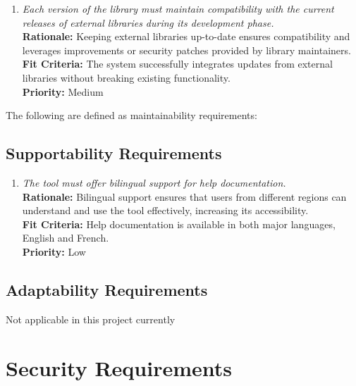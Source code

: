 \documentclass[12pt]{article}
\begin{document}
\begin{enumerate}[label=MS-MNT \arabic*., wide=0pt, leftmargin=*]
  \item \emph{Each version of the library must maintain compatibility with the current releases of external libraries during its development phase.}\\
  {\bf Rationale:} Keeping external libraries up-to-date ensures compatibility and leverages improvements or security patches provided by library maintainers.\\
  {\bf Fit Criteria:} The system successfully integrates updates from external libraries without breaking existing functionality.\\
  {\bf Priority:} Medium

\end{enumerate}

The following are defined as maintainability requirements:
\subsection{Supportability Requirements}
\begin{enumerate}[label=MS-SP \arabic*., wide=0pt, leftmargin=*]
  \item \emph{The tool must offer bilingual support for help documentation.}\\
  {\bf Rationale:} Bilingual support ensures that users from different regions can understand and use the tool effectively, increasing its accessibility.\\
  {\bf Fit Criteria:} Help documentation is available in both major languages, English and French.\\
  {\bf Priority:} Low
\end{enumerate}

\subsection{Adaptability Requirements}
Not applicable in this project currently

\section{Security Requirements}
\end{document}
